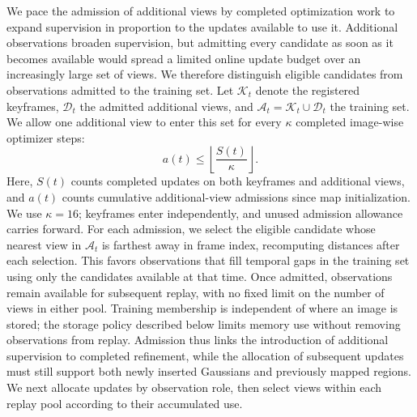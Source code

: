 We pace the admission of additional views by completed optimization work to expand supervision in proportion to the updates available to use it.
Additional observations broaden supervision, but admitting every candidate as soon as it becomes available would spread a limited online update budget over an increasingly large set of views.
We therefore distinguish eligible candidates from observations admitted to the training set.
Let $\mathcal K_t$ denote the registered keyframes, $\mathcal D_t$ the admitted additional views, and $\mathcal A_t=\mathcal K_t\cup\mathcal D_t$ the training set.
We allow one additional view to enter this set for every $\kappa$ completed image-wise optimizer steps:
\begin{equation}
  a(t)\leq\left\lfloor\frac{S(t)}{\kappa}\right\rfloor.
  \label{eq:view_growth_constraint}
\end{equation}
Here, $S(t)$ counts completed updates on both keyframes and additional views, and $a(t)$ counts cumulative additional-view admissions since map initialization.
We use $\kappa=16$; keyframes enter independently, and unused admission allowance carries forward.
For each admission, we select the eligible candidate whose nearest view in $\mathcal A_t$ is farthest away in frame index, recomputing distances after each selection.
This favors observations that fill temporal gaps in the training set using only the candidates available at that time.
Once admitted, observations remain available for subsequent replay, with no fixed limit on the number of views in either pool.
Training membership is independent of where an image is stored; the storage policy described below limits memory use without removing observations from replay.
Admission thus links the introduction of additional supervision to completed refinement, while the allocation of subsequent updates must still support both newly inserted Gaussians and previously mapped regions.
We next allocate updates by observation role, then select views within each replay pool according to their accumulated use.

